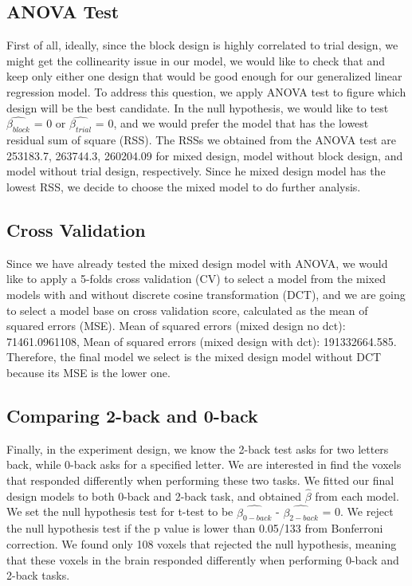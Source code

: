 \subsection{ANOVA Test}

First of all, ideally, since the block design is highly correlated to trial 
design, we might get the collinearity issue in our model, we would like to check
that and keep only either one design that would be good enough for our generalized 
linear regression model. To address this question, we apply ANOVA test to figure which
design will be the best candidate. In the null hypothesis, we would like to test 
$\widehat{\beta_{block}}$ = 0 or $\widehat{\beta_{trial}}$ = 0, and we would prefer the 
model that has the lowest residual sum of square (RSS). The RSSs we obtained from 
the ANOVA test are 253183.7, 263744.3, 260204.09 for mixed design, model without 
block design, and model without trial design, respectively. Since he mixed design model 
has the lowest RSS, we decide to choose the mixed model to do further analysis.

\subsection{Cross Validation}

Since we have already tested the mixed design model with ANOVA, we would like to 
apply a 5-folds cross validation (CV) to select a model from the mixed models with 
and without discrete cosine transformation (DCT), and we are going to select a model
base on cross validation score, calculated as the mean of squared errors (MSE). 
Mean of squared errors (mixed design no dct): 71461.0961108, 
Mean of squared errors (mixed design with dct): 191332664.585. 
Therefore, the final model we select is the mixed design model without DCT 
because its MSE is the lower one. 

\subsection{Comparing 2-back and 0-back}

Finally, in the experiment design, we know the 2-back test asks for two letters back, 
while 0-back asks for a specified letter. We are interested in find the voxels that responded 
differently when performing these two tasks. We fitted our final design models to 
both 0-back and 2-back task, and obtained $\hat{\beta}$ from each model. We set the null 
hypothesis test for t-test to be $\widehat{\beta_{0-back}}$ - $\widehat{\beta_{2-back}}$ = 0. 
We reject the null hypothesis test if the p value is lower than 0.05/133 from Bonferroni 
correction. We found only 108 voxels that rejected the null hypothesis, meaning that these 
voxels in the brain responded differently when performing 0-back and 2-back tasks. 

